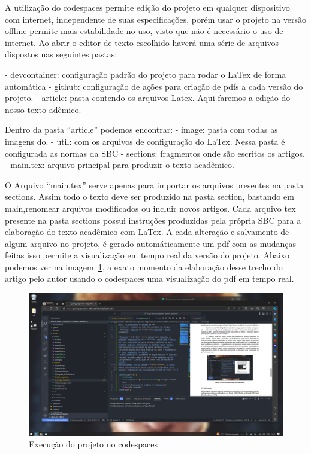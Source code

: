A utilização do codespaces permite edição do projeto em qualquer dispositivo com internet, independente de suas especificações, porém usar o projeto na versão offline permite mais estabilidade no uso, visto que não é necessário o uso de internet.
Ao abrir o editor de texto escolhido haverá uma série de arquivos dispostos nas seguintes pastas:

- devcontainer: configuração padrão do projeto para rodar o LaTex de forma automática
- github: configuração de ações para criação de pdfs a cada versão do projeto.
- article: pasta contendo os arquivos Latex. Aqui faremos a edição do nosso texto adêmico.

Dentro da pasta ``article'' podemos encontrar:
- image: pasta com todas as imagens do.
- util: com os arquivos de configuração do LaTex. Nessa pasta é configurada as normas da SBC
- sections: fragmentos onde são escritos os artigos.
- main.tex: arquivo principal para produzir o texto acadêmico.

O Arquivo ``main.tex'' serve apenas para importar os arquivos presentes na pasta sections. Assim todo o texto deve ser produzido na pasta section, bastando em main,renomear arquivos modificados ou incluir novos artigos. Cada arquivo tex presente na pasta sections possui instruções produzidas pela própria SBC para a elaboração do texto acadêmico com LaTex.
A cada alteração e salvamento de algum arquivo no projeto, é gerado automáticamente um pdf com as mudanças feitas isso permite a visualização em tempo real da versão do projeto.
Abaixo podemos ver na imagem~\ref{fig:image05}, a exato momento da elaboração desse trecho do artigo pelo autor usando o codespaces uma visualização do pdf em tempo real.

\begin{figure}[ht]
	\centering
	\includegraphics[width=.8\textwidth]{./images/image05.png}
	\caption{Execução do projeto no codespaces}
	\label{fig:image05}
\end{figure}